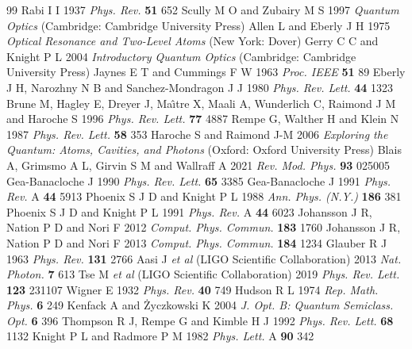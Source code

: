 \documentclass{iopjournal}
\begin{document}

\begin{thebibliography}{99}
 Rabi I I 1937 {\it Phys. Rev.} {\bf 51} 652
 Scully M O and Zubairy M S 1997 {\it Quantum Optics} (Cambridge: Cambridge University Press)
 Allen L and Eberly J H 1975 {\it Optical Resonance and Two-Level Atoms} (New York: Dover)
 Gerry C C and Knight P L 2004 {\it Introductory Quantum Optics} (Cambridge: Cambridge University Press)
 Jaynes E T and Cummings F W 1963 {\it Proc. IEEE} {\bf 51} 89
 Eberly J H, Narozhny N B and Sanchez-Mondragon J J 1980 {\it Phys. Rev. Lett.} {\bf 44} 1323
 Brune M, Hagley E, Dreyer J, Ma\^{\i}tre X, Maali A, Wunderlich C, Raimond J M and Haroche S 1996 {\it Phys. Rev. Lett.} {\bf 77} 4887
 Rempe G, Walther H and Klein N 1987 {\it Phys. Rev. Lett.} {\bf 58} 353
 Haroche S and Raimond J-M 2006 {\it Exploring the Quantum: Atoms, Cavities, and Photons} (Oxford: Oxford University Press)
 Blais A, Grimsmo A L, Girvin S M and Wallraff A 2021 {\it Rev. Mod. Phys.} {\bf 93} 025005
 Gea-Banacloche J 1990 {\it Phys. Rev. Lett.} {\bf 65} 3385
 Gea-Banacloche J 1991 {\it Phys. Rev.} A {\bf 44} 5913
 Phoenix S J D and Knight P L 1988 {\it Ann. Phys. (N.Y.)} {\bf 186} 381
 Phoenix S J D and Knight P L 1991 {\it Phys. Rev.} A {\bf 44} 6023
 Johansson J R, Nation P D and Nori F 2012 {\it Comput. Phys. Commun.} {\bf 183} 1760
 Johansson J R, Nation P D and Nori F 2013 {\it Comput. Phys. Commun.} {\bf 184} 1234
 Glauber R J 1963 {\it Phys. Rev.} {\bf 131} 2766
 Aasi J {\it et al} (LIGO Scientific Collaboration) 2013 {\it Nat. Photon.} {\bf 7} 613
 Tse M {\it et al} (LIGO Scientific Collaboration) 2019 {\it Phys. Rev. Lett.} {\bf 123} 231107
 Wigner E 1932 {\it Phys. Rev.} {\bf 40} 749
 Hudson R L 1974 {\it Rep. Math. Phys.} {\bf 6} 249
 Kenfack A and \.{Z}yczkowski K 2004 {\it J. Opt. B: Quantum Semiclass. Opt.} {\bf 6} 396
 Thompson R J, Rempe G and Kimble H J 1992 {\it Phys. Rev. Lett.} {\bf 68} 1132
 Knight P L and Radmore P M 1982 {\it Phys. Lett.} A {\bf 90} 342

\end{thebibliography}
\end{document}

